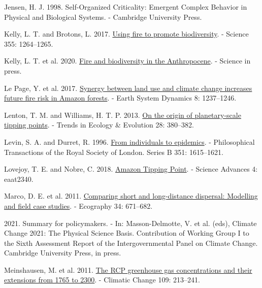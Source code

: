 \documentclass[
]{article}
\newlength{\cslhangindent}
\newenvironment{CSLReferences}[2] %
 {\begin{list}{}{%
  \setlength{\itemindent}{0pt}
  \setlength{\leftmargin}{0pt}
  \setlength{\parsep}{0pt}
  \ifodd #1
   \setlength{\leftmargin}{\cslhangindent}
   \setlength{\itemindent}{-1\cslhangindent}
  \fi
  \setlength{\itemsep}{#2\baselineskip}}}
 {\end{list}}
\begin{document}
\begin{CSLReferences}{1}{1}
Jensen, H. J. 1998. Self-{Organized Criticality}: {Emergent Complex
Behavior} in {Physical} and {Biological Systems}. - {Cambridge
University Press}.

Kelly, L. T. and Brotons, L. 2017.
\href{https://doi.org/10.1126/science.aam7672}{Using fire to promote
biodiversity}. - Science 355: 1264--1265.

Kelly, L. T. et al. 2020.
\href{https://doi.org/10.1126/science.abb0355}{Fire and biodiversity in
the {Anthropocene}}. - Science in press.

Le Page, Y. et al. 2017.
\href{https://doi.org/10.5194/esd-8-1237-2017}{Synergy between land use
and climate change increases future fire risk in {Amazon} forests}. -
Earth System Dynamics 8: 1237--1246.

Lenton, T. M. and Williams, H. T. P. 2013.
\href{https://doi.org/10.1016/j.tree.2013.06.001}{On the origin of
planetary-scale tipping points}. - Trends in Ecology \& Evolution 28:
380--382.

Levin, S. A. and Durret, R. 1996.
\href{https://doi.org/10.1098/rstb.1996.0145}{From individuals to
epidemics}. - Philosophical Transactions of the Royal Society of London.
Series B 351: 1615--1621.

Lovejoy, T. E. and Nobre, C. 2018.
\href{https://doi.org/10.1126/sciadv.aat2340}{Amazon {Tipping Point}}. -
Science Advances 4: eaat2340.

Marco, D. E. et al. 2011.
\href{https://doi.org/10.1111/j.1600-0587.2010.06477.x}{Comparing short
and long-distance dispersal: Modelling and field case studies}. -
Ecography 34: 671--682.

2021. Summary for policymakers. - In: Masson-Delmotte, V. et al. (eds),
Climate {Change} 2021: {The Physical Science Basis}. {Contribution} of
{Working Group I} to the {Sixth Assessment Report} of the
{Intergovernmental Panel} on {Climate Change}. {Cambridge University
Press}, in press.

Meinshausen, M. et al. 2011.
\href{https://doi.org/10.1007/s10584-011-0156-z}{The {RCP} greenhouse
gas concentrations and their extensions from 1765 to 2300}. - Climatic
Change 109: 213--241.


\end{CSLReferences}
\end{document}
